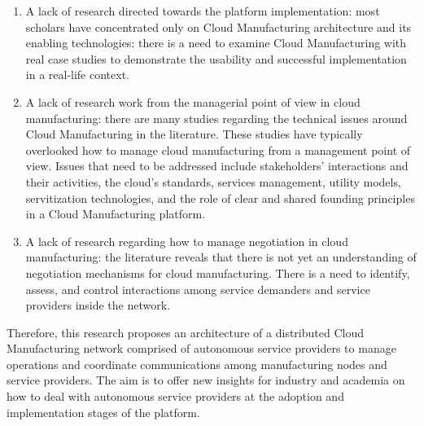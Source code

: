 \begin{enumerate}
    \item A lack of research directed towards the platform implementation: most scholars have concentrated only on Cloud Manufacturing architecture and its enabling technologies: there is a need to examine Cloud Manufacturing with real case studies to demonstrate the usability and successful implementation in a real-life context.
    \item A lack of research work from the managerial point of view in cloud manufacturing: there are many studies regarding the technical issues around Cloud Manufacturing in the literature. These studies have typically overlooked how to manage cloud manufacturing from a management point of view. Issues that need to be addressed include stakeholders’ interactions and their activities, the cloud’s standards, services management, utility models, servitization technologies, and the role of clear and shared founding principles in a Cloud Manufacturing platform.
    \item A lack of research regarding how to manage negotiation in cloud manufacturing: the literature reveals that there is not yet an understanding of negotiation mechanisms for cloud manufacturing. There is a need to identify, assess, and control interactions among service demanders and service providers inside the network.
\end{enumerate}

Therefore, this research proposes an architecture of a distributed Cloud Manufacturing network comprised of autonomous service providers to manage operations and coordinate communications among manufacturing nodes and service providers. The aim is to offer new insights for industry and academia on how to deal with autonomous service providers at the adoption and implementation stages of the platform.
